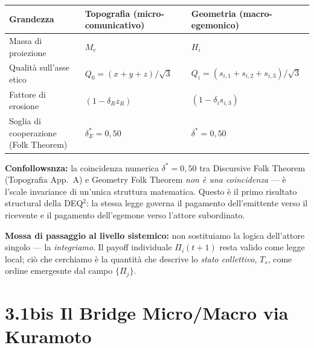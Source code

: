 {\def\LTcaptype{none} %
{\small\begin{longtable}[]{@{}
  >{\raggedright\arraybackslash}p{}
  >{\raggedright\arraybackslash}p{}
  >{\raggedright\arraybackslash}p{}@{}}
\toprule\noalign{}
\begin{minipage}[b]{\linewidth}\raggedright
Grandezza
\end{minipage} & \begin{minipage}[b]{\linewidth}\raggedright
Topografia (micro-comunicativo)
\end{minipage} & \begin{minipage}[b]{\linewidth}\raggedright
Geometria (macro-egemonico)
\end{minipage} \\
\midrule\noalign{}
\endhead
\bottomrule\noalign{}
\endlastfoot
Massa di proiezione & \(M_e\) & \(H_i\) \\
Qualità sull'asse etico & \(Q_0 = (x+y+z)/\sqrt{3}\) &
\(Q_i = (s_{i,1}+s_{i,2}+s_{i,3})/\sqrt{3}\) \\
Fattore di erosione & \((1 - \delta_R z_R)\) &
\((1 - \delta_i s_{i,3})\) \\
Soglia di cooperazione (Folk Theorem) & \(\delta^*_E = 0{,}50\) &
\(\delta^* = 0{,}50\) \\
\end{longtable}}
}

\Proved{} \textbf{Confollowsnza:} la coincidenza numerica
\(\delta^* = 0{,}50\) tra Discursive Folk Theorem (Topografia App.~A) e
Geometry Folk Theorem \emph{non è una coincidenza} --- è
l'scale invariance di un'unica struttura matematica. Questo è il
primo risultato structural della DEQ$^2$: la stessa legge governa il
pagamento dell'emittente verso il ricevente e il pagamento dell'egemone
verso l'attore subordinato.

\Hypoth{} \textbf{Mossa di passaggio al livello sistemico:} non
sostituiamo la logica dell'attore singolo --- la \emph{integriamo}. Il
payoff individuale \(\Pi_i(t+1)\) resta valido come legge local; ciò
che cerchiamo è la quantità che descrive lo \emph{stato collettivo},
\(T_s\), come ordine emergesnte dal campo \(\{\Pi_j\}\).



\section{3.1bis Il Bridge Micro/Macro via
Kuramoto}\label{bis-il-bridge-micromacro-via-kuramoto}


